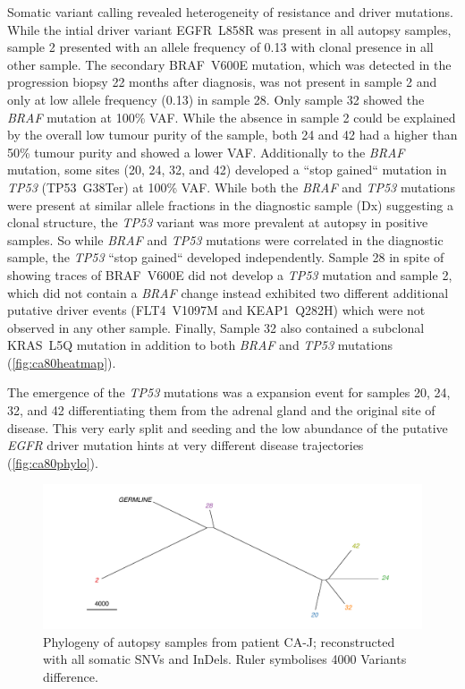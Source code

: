 Somatic variant calling revealed heterogeneity of resistance and driver mutations. While the intial driver variant EGFR~L858R was present in all autopsy samples, sample 2 presented with an allele frequency of 0.13 with clonal presence in all other sample. The secondary BRAF~V600E mutation, which was detected in the progression biopsy 22 months after diagnosis, was not present in sample 2 and only at low allele frequency (0.13) in sample 28. Only sample 32 showed the \textit{BRAF} mutation at 100\% VAF. While the absence in sample 2 could be explained by the overall low tumour purity of the sample, both 24 and 42 had a higher than 50\% tumour purity and showed a lower VAF. Additionally to the \textit{BRAF} mutation, some sites (20, 24, 32, and 42) developed a ``stop gained`` mutation in \textit{TP53} (TP53~G38Ter) at 100\% VAF. While both the \textit{BRAF} and \textit{TP53} mutations were present at similar allele fractions in the diagnostic sample (Dx) suggesting a clonal structure, the \textit{TP53} variant was more prevalent at autopsy in positive samples. So while \textit{BRAF} and \textit{TP53} mutations were correlated in the diagnostic sample, the \textit{TP53} ``stop gained`` developed independently.
Sample 28 in spite of showing traces of BRAF~V600E did not develop a \textit{TP53} mutation and sample 2, which did not contain a \textit{BRAF} change instead exhibited two different additional putative driver events (FLT4~V1097M and KEAP1~Q282H) which were not observed in any other sample. 
Finally, Sample 32 also contained a subclonal KRAS~L5Q mutation in addition to both \textit{BRAF} and \textit{TP53} mutations (\autoref{fig:ca80heatmap}). 

The emergence of the \textit{TP53} mutations was a expansion event for samples 20, 24, 32, and 42 differentiating them from the adrenal gland and the original site of disease. This very early split and seeding and the low abundance of the putative \textit{EGFR} driver mutation hints at very different disease trajectories (\autoref{fig:ca80phylo}). 

\begin{figure}[ht]
	\centering
	\includegraphics[width=.99\linewidth]{Figures/CASCADE/CA80/CA80phylo.pdf}
	\caption[Phylogeny of autopsy samples from patient CA-J]{Phylogeny of autopsy samples from patient CA-J; reconstructed with all somatic SNVs and InDels. Ruler symbolises 4000 Variants difference.} \label{fig:ca80phylo}
\end{figure}


